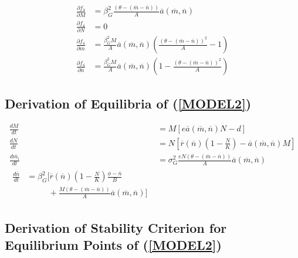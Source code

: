 \documentclass{amsart}
\theoremstyle{definition}
\theoremstyle{remark}
\numberwithin{equation}{section}
\begin{document}
\begin{align*}
	\frac{\partial f_4}{\partial M} &= \beta_{G}^2\frac{(\theta - (\overline{m} - \overline{n}))}{A}\overline{a}(\overline{m}, \overline{n}) \\[5px]
	\frac{\partial f_4}{\partial N} &= 0 \\[5px]
	\frac{\partial f_4}{\partial \overline{m}} &= \frac{\beta_G^2M}{A}\overline{a}(\overline{m}, \overline{n})\left(\frac{(\theta - (\overline{m} - \overline{n}))^2}{A} - 1\right)\\[5px]
	\frac{\partial f_4}{\partial \overline{n}} &= \frac{\beta_G^2M}{A}\overline{a}(\overline{m}, \overline{n})\left(1 - \frac{(\theta - (\overline{m} - \overline{n}))^2}{A}\right)
\end{align*}

\subsection*{Derivation of Equilibria of (\ref{MODEL2})}
\begin{align*}
	\frac{dM}{dt} &= M\left[e\overline{a}(\overline{m}, \overline{n})N - d\right] \\[5px]
	\frac{dN}{dt} &= N\left[\overline{r}(\overline{n})\left(1 - \frac{N}{K}\right) - \overline{a}(\overline{m}, \overline{n})M\right] \\[5px]
	\frac{d\overline{m_i}}{dt} &= \sigma_{G}^2\frac{eN(\theta - (\overline{m} - \overline{n}))}{A}\overline{a}(\overline{m}, \overline{n}) \\[5px]
	\begin{split}
		\frac{d\overline{n}}{dt} &= \beta_{G}^2\Bigg[\overline{r}(\overline{n})\left(1 - \frac{N}{K}\right)\frac{\phi - \overline{n}}{B} \\
		&\ \ \ \ \ \ \ \ \ \ \ \ + \frac{M(\theta - (\overline{m} - \overline{n}))}{A}\overline{a}(\overline{m}, \overline{n})\Bigg]
	\end{split}
\end{align*}

\subsection*{Derivation of Stability Criterion for Equilibrium Points of (\ref{MODEL2})}

\end{document}
